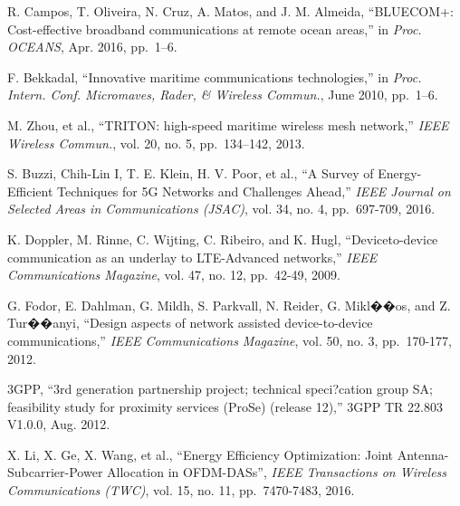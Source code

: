 \documentclass{ieeeaccess}
\begin{document}
\begin{thebibliography}{10}
  
  
  
  R. Campos, T. Oliveira, N. Cruz, A. Matos, and J. M. Almeida,
  ``BLUECOM+: Cost-effective broadband communications at remote ocean areas,'' in
  \emph{Proc. OCEANS}, Apr. 2016, pp.~1--6.
  
  F. Bekkadal, ``Innovative maritime communications technologies,'' in
  \emph{Proc. Intern. Conf. Micromaves, Rader, \& Wireless Commun.}, June 2010, pp.~1--6.
  
  M. Zhou, et al., ``TRITON: high-speed maritime wireless mesh network,''
  \emph{IEEE Wireless Commun.}, vol. 20, no. 5, pp.~134--142, 2013.
  
  
  S. Buzzi, Chih-Lin I, T. E. Klein, H. V. Poor, et al., ``A Survey of Energy-Efficient Techniques for 5G Networks and Challenges Ahead,''
  \emph{IEEE Journal on Selected Areas in Communications (JSAC)}, vol. 34, no. 4, pp.~697-709, 2016.
  
  K. Doppler, M. Rinne, C. Wijting, C. Ribeiro, and K. Hugl, ``Deviceto-device communication as an underlay to LTE-Advanced networks,''
    \emph{IEEE Communications Magazine}, vol. 47, no. 12, pp.~42-49, 2009.
   
  G. Fodor, E. Dahlman, G. Mildh, S. Parkvall, N. Reider, G. Mikl��os, and Z. Tur��anyi, ``Design aspects of network assisted device-to-device communications,''
    \emph{IEEE Communications Magazine}, vol. 50, no. 3, pp.~170-177, 2012.
     
   3GPP, ``3rd generation partnership project; technical speci?cation group SA; feasibility study for proximity services (ProSe) (release 12),'' 3GPP TR 22.803 V1.0.0, Aug. 2012.
  
  X. Li, X. Ge, X. Wang, et al., ``Energy Efficiency Optimization: Joint Antenna-Subcarrier-Power Allocation in OFDM-DASs'',
  \emph{IEEE Transactions on Wireless Communications (TWC)}, vol. 15, no. 11, pp.~7470-7483, 2016.
  

\end{thebibliography}
\end{document}
